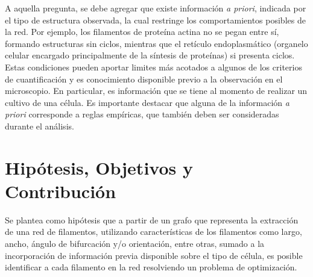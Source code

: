 \documentclass{article}
\begin{document}
A aquella pregunta, se debe agregar que existe informaci\'on \textit{a priori}, indicada por el tipo de estructura observada, la cual restringe los comportamientos posibles de la red. Por ejemplo, los filamentos de prote\'ina actina no se pegan entre s\'i, formando estructuras sin ciclos, mientras que el ret\'iculo endoplasm\'atico (organelo celular encargado principalmente de la s\'intesis de prote\'inas) si presenta ciclos. Estas condiciones pueden aportar limites m\'as acotados a algunos de los criterios de cuantificaci\'on y es conocimiento disponible previo a la observaci\'on en el microscopio. En particular, es informaci\'on que se tiene al momento de realizar un cultivo de una c\'elula. 
Es importante destacar que alguna de la informaci\'on {\it a priori} corresponde a reglas emp\'iricas, que tambi\'en deben ser consideradas durante el an\'alisis.




\section{Hipótesis, Objetivos y Contribuci\'on}
\label{hipotesis}


Se plantea como hip\'otesis que a partir de un grafo que representa la extracci\'on de una red de filamentos, utilizando caracter\'isticas de los filamentos como largo, ancho, \'angulo de bifurcaci\'on y/o orientaci\'on, entre otras, sumado a la incorporaci\'on de informaci\'on previa disponible sobre el tipo de c\'elula, es posible identificar a cada filamento en la red resolviendo un problema de optimizaci\'on.
\end{document}
